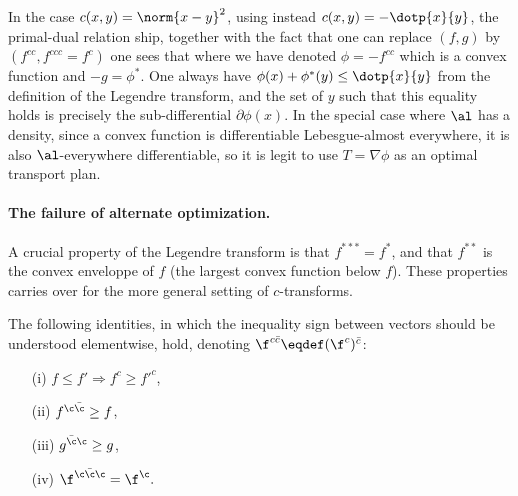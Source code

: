 \begin{rem}\label{rem-proof-brenier}
	In the case $c(x,y)=\norm{x-y}^2$, using instead $c(x,y)=-\dotp{x}{y}$, the primal-dual relation ship, together with the fact that one can replace $(f,g)$ by $(f^{cc},f^{ccc}=f^c)$ one sees that 
	where we have denoted $\phi=-f^{cc}$ which is a convex function and $-g=\phi^*$. 
	One always have $\phi(x)+\phi^*(y) \leq \dotp{x}{y}$ from the definition of the Legendre transform, and the set of $y$ such that this equality holds is precisely the sub-differential $\partial\phi(x)$.
	In the special case where $\al$ has a density, since a convex function is differentiable Lebesgue-almost everywhere, it is also $\al$-everywhere differentiable, so it is legit to use $T=\nabla\phi$ as an optimal transport plan.
\end{rem}



\paragraph{The failure of alternate optimization.}

A crucial property of the Legendre transform is that $f^{***}=f^*$, and that $f^{**}$ is the convex enveloppe of $f$ (the largest convex function below $f$). These properties carries over for the more general setting of $c$-transforms.

\begin{prop}
The following identities, in which the inequality sign between vectors should be understood elementwise, hold, denoting $\f^{c\bar c} \eqdef (\f^{c})^{\bar c}$:
	\begin{itemize}
	\item[(i)] $f \leq f' \Rightarrow f^{c}\geq f'^{c}$, 
	\item[(ii)] $f^{\c\bar{\c}} \geq f$, 
	\item [(iii)] $g^{\bar{\c}\c} \geq g$, 
	\item[(iv)] $\f^{\c\bar{\c}\c}=\f^{\c}.$
	\end{itemize}	
\end{prop}

